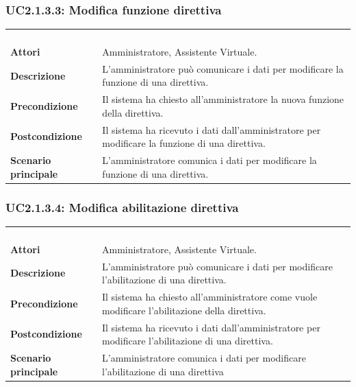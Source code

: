 \subsubsection{UC2.1.3.3: Modifica funzione direttiva}
\label{UC2.1.3.3}
\begin{longtable}{l|p{10cm}}
	\rowcolor[gray]{0.8} \multicolumn{2}{c}{} \\
	\rowcolor[gray]{0.8} \multicolumn{2}{c}{\textbf{UC2.1.3.3 - Modifica funzione direttiva}} \\
	\rowcolor[gray]{0.8} \multicolumn{2}{c}{} \\
	\hline
	&\\
	\textbf{Attori} & Amministratore, Assistente Virtuale.\\[7pt]
	\textbf{Descrizione} & L'amministratore può comunicare i dati per modificare la funzione di una direttiva.\\[7pt]
	\textbf{Precondizione} & Il sistema ha chiesto all'amministratore la nuova funzione della direttiva.\\[7pt]
	\textbf{Postcondizione} & Il sistema ha ricevuto i dati dall'amministratore per modificare la funzione di una direttiva.\\[7pt]
	\textbf{Scenario principale} &L'amministratore comunica i dati per modificare la funzione di una direttiva.\\[7pt]\hline
\end{longtable}

\subsubsection{UC2.1.3.4: Modifica abilitazione direttiva}
\label{UC2.1.3.4}
\begin{longtable}{l|p{10cm}}
	\rowcolor[gray]{0.8} \multicolumn{2}{c}{} \\
	\rowcolor[gray]{0.8} \multicolumn{2}{c}{\textbf{UC2.1.3.4 - Modifica abilitazione direttiva}} \\
	\rowcolor[gray]{0.8} \multicolumn{2}{c}{} \\
	\hline
	&\\
	\textbf{Attori} & Amministratore, Assistente Virtuale.\\[7pt]
	\textbf{Descrizione} & L'amministratore può comunicare i dati per modificare l'abilitazione di una direttiva.\\[7pt]
	\textbf{Precondizione} & Il sistema ha chiesto all'amministratore come vuole modificare l'abilitazione della direttiva.\\[7pt]
	\textbf{Postcondizione} & Il sistema ha ricevuto i dati dall'amministratore per modificare l'abilitazione di una direttiva.\\[7pt]
	\textbf{Scenario principale} &L'amministratore comunica i dati per modificare l'abilitazione di una direttiva\\[7pt]\hline
\end{longtable}

